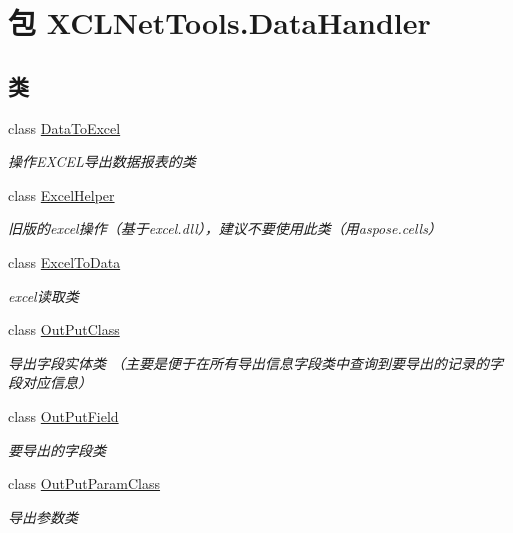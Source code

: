 \hypertarget{namespace_x_c_l_net_tools_1_1_data_handler}{\section{包 X\-C\-L\-Net\-Tools.\-Data\-Handler}
\label{namespace_x_c_l_net_tools_1_1_data_handler}
}
\subsection*{类}
\begin{DoxyCompactItemize}
\item 
class \hyperlink{class_x_c_l_net_tools_1_1_data_handler_1_1_data_to_excel}{Data\-To\-Excel}
\begin{DoxyCompactList}\small\item\em 操作\-E\-X\-C\-E\-L导出数据报表的类 \end{DoxyCompactList}\item 
class \hyperlink{class_x_c_l_net_tools_1_1_data_handler_1_1_excel_helper}{Excel\-Helper}
\begin{DoxyCompactList}\small\item\em 旧版的excel操作（基于excel.\-dll），建议不要使用此类（用aspose.\-cells） \end{DoxyCompactList}\item 
class \hyperlink{class_x_c_l_net_tools_1_1_data_handler_1_1_excel_to_data}{Excel\-To\-Data}
\begin{DoxyCompactList}\small\item\em excel读取类 \end{DoxyCompactList}\item 
class \hyperlink{class_x_c_l_net_tools_1_1_data_handler_1_1_out_put_class}{Out\-Put\-Class}
\begin{DoxyCompactList}\small\item\em 导出字段实体类 （主要是便于在所有导出信息字段类中查询到要导出的记录的字段对应信息） \end{DoxyCompactList}\item 
class \hyperlink{class_x_c_l_net_tools_1_1_data_handler_1_1_out_put_field}{Out\-Put\-Field}
\begin{DoxyCompactList}\small\item\em 要导出的字段类 \end{DoxyCompactList}\item 
class \hyperlink{class_x_c_l_net_tools_1_1_data_handler_1_1_out_put_param_class}{Out\-Put\-Param\-Class}
\begin{DoxyCompactList}\small\item\em 导出参数类 \end{DoxyCompactList}\end{DoxyCompactItemize}
